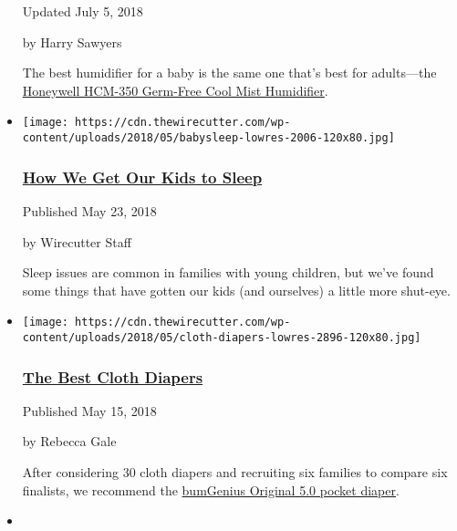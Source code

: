\begin{itemize}
  Updated July 5, 2018

  by Harry Sawyers

  The best humidifier for a baby is the same one that's best for
  adults---the
  \href{https://www.nytimes3xbfgragh.onion/wirecutter/out/link/7454/0/4/74796/}{Honeywell
  HCM-350 Germ-Free Cool Mist Humidifier}.
\item
  \href{https://www.nytimes3xbfgragh.onion/wirecutter/reviews/how-we-get-our-kids-to-sleep/}{}

  \texttt{[image: https://cdn.thewirecutter.com/wp-content/uploads/2018/05/babysleep-lowres-2006-120x80.jpg]}

  \hypertarget{how-we-get-our-kids-to-sleep}{%
  \subsubsection{\texorpdfstring{\href{https://www.nytimes3xbfgragh.onion/wirecutter/reviews/how-we-get-our-kids-to-sleep/}{How
  We Get Our Kids to
  Sleep}}{How We Get Our Kids to Sleep}}\label{how-we-get-our-kids-to-sleep}}

  Published May 23, 2018

  by Wirecutter Staff

  Sleep issues are common in families with young children, but we've
  found some things that have gotten our kids (and ourselves) a little
  more shut-eye.
\item
  \href{https://www.nytimes3xbfgragh.onion/wirecutter/reviews/best-cloth-diapers/}{}

  \texttt{[image: https://cdn.thewirecutter.com/wp-content/uploads/2018/05/cloth-diapers-lowres-2896-120x80.jpg]}

  \hypertarget{the-best-cloth-diapers}{%
  \subsubsection{\texorpdfstring{\href{https://www.nytimes3xbfgragh.onion/wirecutter/reviews/best-cloth-diapers/}{The
  Best Cloth
  Diapers}}{The Best Cloth Diapers}}\label{the-best-cloth-diapers}}

  Published May 15, 2018

  by Rebecca Gale

  After considering 30 cloth diapers and recruiting six families to
  compare six finalists, we recommend the
  \href{https://www.nytimes3xbfgragh.onion/wirecutter/out/link/26532/0/4/75112/}{bumGenius
  Original 5.0 pocket diaper}.
\item
  \href{https://www.nytimes3xbfgragh.onion/wirecutter/reviews/best-diapers/}{}


\end{itemize}
